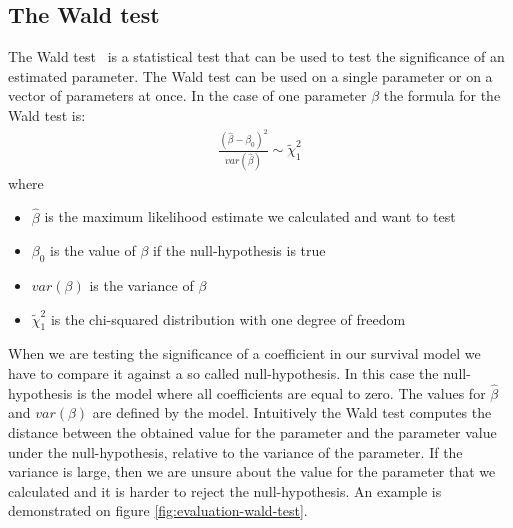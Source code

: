  \subsection{The Wald test}
 \label{subsec:evaluation-wald-test}
The Wald test~\cite{wikiwald} is a statistical test that can be used to test the significance of an estimated parameter. The Wald test can be used on a single parameter or on a vector of parameters at once. In the case of one parameter $\beta$ the formula for the Wald test is:
\begin{equation}
\begin{split}
\frac{(\hat{\beta}-\beta_{0})^{2}}{var(\hat{\beta})} \sim \tilde{\chi}^{2}_{1}
\end{split}
\end{equation}
where
\begin{itemize}
	\item $\hat{\beta}$ is the maximum likelihood estimate we calculated and want to test
	\item $\beta_{0}$ is the value of $\beta$ if the null-hypothesis is true
	\item $var(\beta)$ is the variance of $\beta$
	\item $\tilde{\chi}^{2}_{1}$ is the chi-squared distribution with one degree of freedom
\end{itemize}
When we are testing the significance of a coefficient in our survival model we have to compare it against a so called null-hypothesis. In this case the null-hypothesis is the model where all coefficients are equal to zero. The values for $\hat{\beta}$ and $var(\beta)$ are defined by the model. Intuitively the Wald test computes the distance between the obtained value for the parameter and the parameter value under the null-hypothesis, relative to the variance of the parameter. If the variance is large, then we are unsure about the value for the parameter that we calculated and it is harder to reject the null-hypothesis. An example is demonstrated on figure \ref{fig:evaluation-wald-test}. \\ \\
